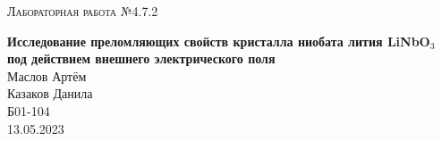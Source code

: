 \documentclass[12pt,a4paper]{extreport}
\begin{document}
	
	\begin{center}
		\large
		\textsc{Лабораторная работа №4.7.2}
		
		\LARGE
		\textbf{Исследование преломляющих свойств кристалла ниобата лития LiNbO$_3$ под действием внешнего электрического поля}
		\\[5mm]

		\large
		Маслов Артём \\
		Казаков Данила \\
		Б01-104
		\\[3mm]
		13.05.2023
	\end{center}
			
	
	
	
	
	

	
	
	
	
	
	
\end{document}
